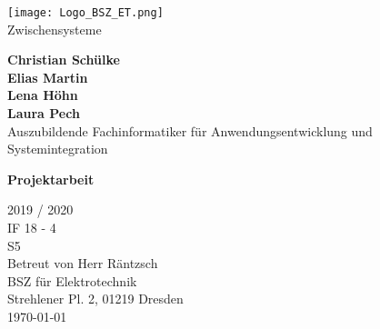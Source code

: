 \begin{titlepage}
    \begin{center}
        \texttt{[image: Logo\_BSZ\_ET.png]}\\
        \vspace*{1cm}
        {\huge{Zwischensysteme}}
 
        \vspace{0.5cm}
         
        \vspace{1.5cm}
 
        \textbf{Christian Schülke\\Elias Martin\\Lena Höhn\\Laura Pech}\\
        Auszubildende Fachinformatiker für Anwendungsentwicklung und Systemintegration\\

        \vfill
 



        \vfill
        {\huge\textbf{Projektarbeit}}
        
    
        \vspace{1cm}
        {\Huge 2019 / 2020}\\
        \vspace{0.8cm}
        IF 18 - 4\\
        S5\\
        Betreut von Herr Räntzsch\\
        BSZ für Elektrotechnik\\
        Strehlener Pl. 2, 01219 Dresden\\
        \today
             
    \end{center}
 \end{titlepage}